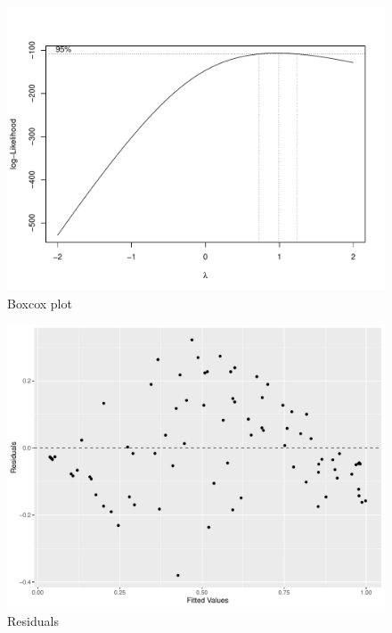 \documentclass[12pt,a4paper]{article}
\begin{document}
\begin{appendices}
\begin{figure}[H]
	\includegraphics[width=\linewidth]{boxcox.pdf}
	\caption{Boxcox plot}	 %
	\label{fig:boxcox}
\end{figure}

\begin{figure}[H]
	\includegraphics[width=\linewidth]{residuals.pdf}
	\caption{Residuals}	 %
	\label{fig:residuals}
\end{figure}


\end{appendices}
\end{document}
